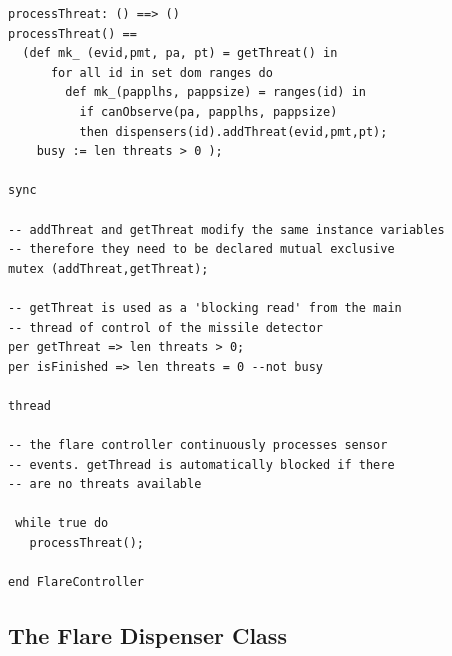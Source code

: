 \documentclass{overturerepchap}
\begin{document}
\begin{lstlisting}
processThreat: () ==> ()
processThreat() ==
  (def mk_ (evid,pmt, pa, pt) = getThreat() in
      for all id in set dom ranges do
        def mk_(papplhs, pappsize) = ranges(id) in
          if canObserve(pa, papplhs, pappsize)
          then dispensers(id).addThreat(evid,pmt,pt);
    busy := len threats > 0 );

sync

-- addThreat and getThreat modify the same instance variables
-- therefore they need to be declared mutual exclusive
mutex (addThreat,getThreat);

-- getThreat is used as a 'blocking read' from the main
-- thread of control of the missile detector
per getThreat => len threats > 0;
per isFinished => len threats = 0 --not busy

thread

-- the flare controller continuously processes sensor
-- events. getThread is automatically blocked if there
-- are no threats available

 while true do
   processThreat();

end FlareController
\end{lstlisting}

\subsection{The Flare Dispenser Class}
\end{document}
